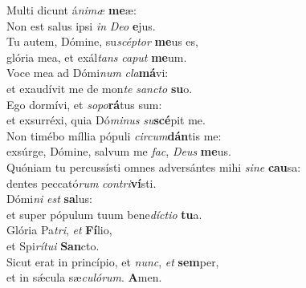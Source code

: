 \evenverse Multi dicunt á\textit{ni}\textit{mæ} \textbf{me}æ:~\*\\
\evenverse Non est salus ipsi \textit{in} \textit{De}\textit{o} \textbf{e}jus.\\
\oddverse Tu autem, Dómine, su\textit{scép}\textit{tor} \textbf{me}us es,~\*\\
\oddverse glória mea, et exál\textit{tans} \textit{ca}\textit{put} \textbf{me}um.\\
\evenverse Voce mea ad Dómi\textit{num} \textit{cla}\textbf{má}vi:~\*\\
\evenverse et exaudívit me de mon\textit{te} \textit{san}\textit{cto} \textbf{su}o.\\
\oddverse Ego dormívi, et \textit{so}\textit{po}\textbf{rá}tus sum:~\*\\
\oddverse et exsurréxi, quia Dó\textit{mi}\textit{nus} \textit{su}\textbf{scé}pit me.\\
\evenverse Non timébo míllia pópuli \textit{cir}\textit{cum}\textbf{dán}tis me:~\*\\
\evenverse exsúrge, Dómine, salvum me \textit{fac}, \textit{De}\textit{us} \textbf{me}us.\\
\oddverse Quóniam tu percussísti omnes adversántes mihi \textit{si}\textit{ne} \textbf{cau}sa:~\*\\
\oddverse dentes peccató\textit{rum} \textit{con}\textit{tri}\textbf{ví}sti.\\
\evenverse Dómi\textit{ni} \textit{est} \textbf{sa}lus:~\*\\
\evenverse et super pópulum tuum bene\textit{dí}\textit{cti}\textit{o} \textbf{tu}a.\\
\oddverse Glória Pa\textit{tri}, \textit{et} \textbf{Fí}lio,~\*\\
\oddverse et Spi\textit{rí}\textit{tu}\textit{i} \textbf{San}cto.\\
\evenverse Sicut erat in princípio, et \textit{nunc}, \textit{et} \textbf{sem}per,~\*\\
\evenverse et in sǽcula sæ\textit{cu}\textit{ló}\textit{rum}. \textbf{A}men.\\
